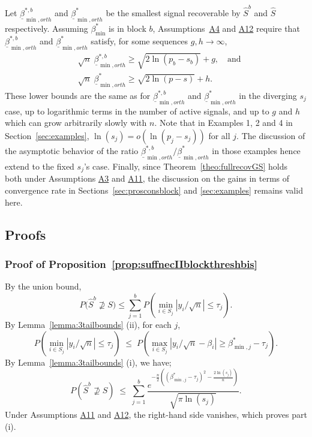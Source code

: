 \documentclass[bj,authoryear]{imsart}
\theoremstyle{plain}
\begin{document}
Let $\underline{\beta}_{\min,orth}^{*, b}$ and $\underline{\beta}_{\min , orth}^*$ be the smallest signal recoverable by $\hat{S}^b$ and $\hat{S}$ respectively. Assuming $\beta_{\min}^*$ is in block $b$, Assumptions~\hyperlink{lab:A4}{A4} and \hyperlink{lab:A12}{A12} require that $\underline{\beta}_{\min,orth}^{*, b}$ and $\underline{\beta}_{\min,orth }^*$ satisfy, for some sequences $g, h \rightarrow \infty$,
\begin{align*}
& \sqrt{n}\;\underline{\beta}_{\min ,orth}^{*, b} \geq \sqrt{2\ln \left(p_b-s_b\right)}+g, \quad\text{and}\\
& \sqrt{n}\;\underline{\beta}_{\min,orth}^* \geq \sqrt{2\ln(p-s)}+h.
\end{align*}
These lower bounds are the same as for $\underline{\beta}_{\min ,orth}^{*, b}$ and $ \underline{\beta}_{\min, orth}^*$ in the diverging $s_j$ case, up to logarithmic terms in the number of active signals, and up to $g$ and $h$ which can grow arbitrarily slowly with $n$. Note that in Examples 1, 2 and 4 in Section~\ref{sec:examples}, $\ln(s_j)=o(\ln(p_j-s_j))$ for all $j$. The discussion of the asymptotic behavior of the ratio $\underline{\beta}_{\min ,orth}^{*, b} / \underline{\beta}_{\min, orth}^*$ in those examples hence extend to the fixed $s_j$'s case. Finally, since Theorem~\ref{theo:fullrecovGS} holds both under Assumptions \hyperlink{lab:A3}{A3} and \hyperlink{lab:A11}{A11}, the discussion on the gains in terms of convergence rate in Sections~\ref{sec:prosconsblock} and \ref{sec:examples} remains valid here.

\subsection{Proofs}

\subsubsection{Proof of Proposition~\ref{prop:suffnecIIblockthreshbis}}
 By the union bound, 
$$P\big(\hat{S}^{b} \not\supseteq S\big)\leq \sum_{j=1}^b  P\left(\min_{i\in S_j}|y_i/\sqrt{n}|\leq\tau_j\right).$$ 
By Lemma~\ref{lemma:3tailbounds} (ii), for each $j$,	
$$P\left(\min_{i\in S_j}|y_i/\sqrt{n}|\leq\tau_j\right)\;\leq\; P\left(\max_{i\in S_j}|y_i/\sqrt{n}-\beta_i| \geq\beta_{\min,j}^*-\tau_j \right).$$ By Lemma~\ref{lemma:3tailbounds} (i), we have;
\begin{equation}
P\left(\hat{S}^{b}\not\supseteq S \right) \;\leq\;\sum_{j=1}^b\frac{e^{-\tfrac{n}{2}\left((\beta^*_{\min,j}-\tau_j)^2-\tfrac{2\ln(s_j)}{n}\right)}}{\sqrt{\pi\ln(s_j)}}.		
\end{equation}
Under Assumptions \hyperlink{lab:A11}{A11} and \hyperlink{lab:A12}{A12}, %
the right-hand side vanishes, which proves part (i). 
\end{document}
